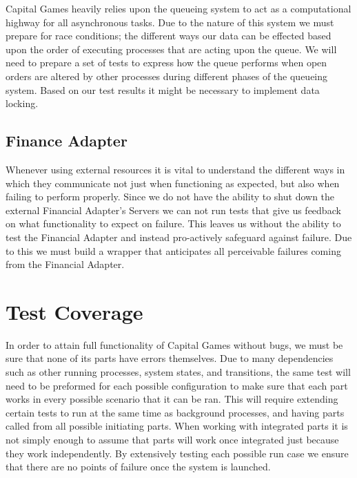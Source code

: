 Capital Games heavily relies upon the queueing system to act as a 
computational highway for all asynchronous tasks.  Due to the 
nature of this system we must prepare for race conditions; the 
different ways our data can be effected based upon the order of 
executing processes that are acting upon the queue. We will need 
to prepare a set of tests to express how the queue performs when 
open orders are altered by other processes during different phases 
of the queueing system. Based on our test results it might be 
necessary to implement data locking.

\subsection{Finance Adapter}

Whenever using external resources it is vital to understand the 
different ways in which they communicate not just when functioning 
as expected, but also when failing to perform properly.  Since we 
do not have the ability to shut down the external Financial 
Adapter's Servers we can not run tests that give us feedback on 
what functionality to expect on failure.  This leaves us without 
the ability to test the Financial Adapter and instead pro-actively 
safeguard against failure. Due to this we must build a wrapper that 
anticipates all perceivable failures coming from the Financial Adapter.

\section{Test Coverage}

In order to attain full functionality of Capital Games without bugs, 
we must be sure that none of its parts have errors themselves.  Due 
to many dependencies such as other running processes, system states, 
and transitions, the same test will need to be preformed for each 
possible configuration to make sure that each part works in every 
possible scenario that it can be ran. This will require extending 
certain tests to run at the same time as background processes, and 
having parts called from all possible initiating parts. When working 
with integrated parts it is not simply enough to assume that parts 
will work once integrated just because they work independently. By 
extensively testing each possible run case we ensure that there are 
no points of failure once the system is launched.


